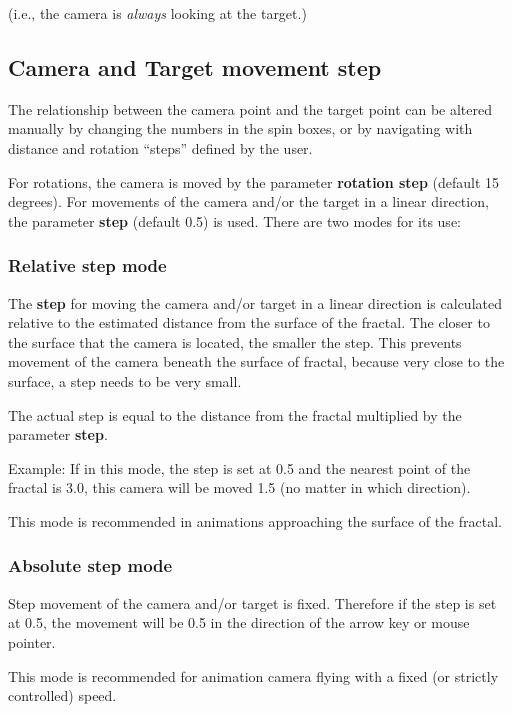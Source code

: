 (i.e., the camera is \emph{always} looking at the target.)

\subsection{Camera and Target movement
step}\label{camera-and-target-movement-step}

The relationship between the camera point and the target point can be
altered manually by changing the numbers in the spin boxes, or by
navigating with distance and rotation ``steps'' defined by the user.

For rotations, the camera is moved by the parameter \textbf{rotation
step} (default 15 degrees). For movements of the camera and/or the
target in a linear direction, the parameter \textbf{step} (default 0.5)
is used. There are two modes for its use:

\subsubsection{Relative step mode}\label{relative-step-mode}

The \textbf{step} for moving the camera and/or target in a linear
direction is calculated relative to the estimated distance from the
surface of the fractal. The closer to the surface that the camera is
located, the smaller the step. This prevents movement of the camera
beneath the surface of fractal, because very close to the surface, a
step needs to be very small.

The actual step is equal to the distance from the fractal multiplied by
the parameter \textbf{step}.

Example: If in this mode, the step is set at 0.5 and the nearest point
of the fractal is 3.0, this camera will be moved 1.5 (no matter in which
direction).

This mode is recommended in animations approaching the surface of the
fractal.

\subsubsection{Absolute step mode}\label{absolute-step-mode}

Step movement of the camera and/or target is fixed. Therefore if the
step is set at 0.5, the movement will be 0.5 in the direction of the
arrow key or mouse pointer.

This mode is recommended for animation camera flying with a fixed (or
strictly controlled) speed.

